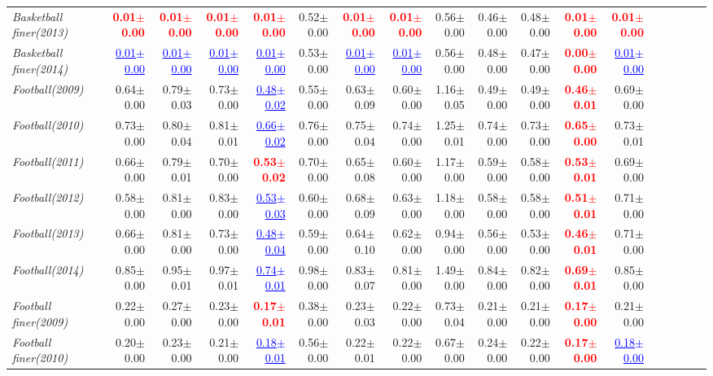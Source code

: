 \documentclass[nohyperref]{article}
\theoremstyle{plain}
\theoremstyle{definition}
\theoremstyle{remark}
\newcommand{\red}[1]{\textcolor{red}{\textbf{#1}}}
\newcommand{\blue}[1]{\textcolor{blue}{\underline{#1}}}
\begin{document}
\begin{table*}[!ht]
{\begin{tabular}{lrrrrrrrrrrrrrrrrr}
			{\it Basketball finer(2013)} & \red{0.01$\pm$0.00} & \red{0.01$\pm$0.00} & \red{0.01$\pm$0.00} & \red{0.01$\pm$0.00} & 0.52$\pm$0.00 & \red{0.01$\pm$0.00} & \red{0.01$\pm$0.00} & 0.56$\pm$0.00 & 0.46$\pm$0.00 & 0.48$\pm$0.00 & \red{0.01$\pm$0.00} & \red{0.01$\pm$0.00} \\
			{\it Basketball finer(2014)} & \blue{0.01$\pm$0.00} & \blue{0.01$\pm$0.00} & \blue{0.01$\pm$0.00} & \blue{0.01$\pm$0.00} & 0.53$\pm$0.00 & \blue{0.01$\pm$0.00} & \blue{0.01$\pm$0.00} & 0.56$\pm$0.00 & 0.48$\pm$0.00 & 0.47$\pm$0.00 & \red{0.00$\pm$0.00} & \blue{0.01$\pm$0.00} \\
			{\it Football(2009)} & 0.64$\pm$0.00 & 0.79$\pm$0.03 & 0.73$\pm$0.00 & \blue{0.48$\pm$0.02} & 0.55$\pm$0.00 & 0.63$\pm$0.09 & 0.60$\pm$0.00 & 1.16$\pm$0.05 & 0.49$\pm$0.00 & 0.49$\pm$0.00 & \red{0.46$\pm$0.01} & 0.69$\pm$0.00 \\
			{\it Football(2010)} & 0.73$\pm$0.00 & 0.80$\pm$0.04 & 0.81$\pm$0.01 & \blue{0.66$\pm$0.02} & 0.76$\pm$0.00 & 0.75$\pm$0.04 & 0.74$\pm$0.00 & 1.25$\pm$0.01 & 0.74$\pm$0.00 & 0.73$\pm$0.00 & \red{0.65$\pm$0.00} & 0.73$\pm$0.01 \\
			{\it Football(2011)} & 0.66$\pm$0.00 & 0.79$\pm$0.01 & 0.70$\pm$0.00 & \red{0.53$\pm$0.02} & 0.70$\pm$0.00 & 0.65$\pm$0.08 & 0.60$\pm$0.00 & 1.17$\pm$0.00 & 0.59$\pm$0.00 & 0.58$\pm$0.00 & \red{0.53$\pm$0.01} & 0.69$\pm$0.00 \\
			{\it Football(2012)} & 0.58$\pm$0.00 & 0.81$\pm$0.00 & 0.83$\pm$0.00 & \blue{0.53$\pm$0.03} & 0.60$\pm$0.00 & 0.68$\pm$0.09 & 0.63$\pm$0.00 & 1.18$\pm$0.00 & 0.58$\pm$0.00 & 0.58$\pm$0.00 & \red{0.51$\pm$0.01} & 0.71$\pm$0.00 \\
			{\it Football(2013)} & 0.66$\pm$0.00 & 0.81$\pm$0.00 & 0.73$\pm$0.00 & \blue{0.48$\pm$0.04} & 0.59$\pm$0.00 & 0.64$\pm$0.10 & 0.62$\pm$0.00 & 0.94$\pm$0.00 & 0.56$\pm$0.00 & 0.53$\pm$0.00 & \red{0.46$\pm$0.01} & 0.71$\pm$0.00 \\
			{\it Football(2014)} & 0.85$\pm$0.00 & 0.95$\pm$0.01 & 0.97$\pm$0.01 & \blue{0.74$\pm$0.01} & 0.98$\pm$0.00 & 0.83$\pm$0.07 & 0.81$\pm$0.00 & 1.49$\pm$0.00 & 0.84$\pm$0.00 & 0.82$\pm$0.00 & \red{0.69$\pm$0.01} & 0.85$\pm$0.00 \\
			{\it Football finer(2009)} & 0.22$\pm$0.00 & 0.27$\pm$0.00 & 0.23$\pm$0.00 & \red{0.17$\pm$0.01} & 0.38$\pm$0.00 & 0.23$\pm$0.03 & 0.22$\pm$0.00 & 0.73$\pm$0.04 & 0.21$\pm$0.00 & 0.21$\pm$0.00 & \red{0.17$\pm$0.00} & 0.21$\pm$0.00 \\
			{\it Football finer(2010)} & 0.20$\pm$0.00 & 0.23$\pm$0.00 & 0.21$\pm$0.00 & \blue{0.18$\pm$0.01} & 0.56$\pm$0.00 & 0.22$\pm$0.01 & 0.22$\pm$0.00 & 0.67$\pm$0.00 & 0.24$\pm$0.00 & 0.22$\pm$0.00 & \red{0.17$\pm$0.00} & \blue{0.18$\pm$0.00} \\

\end{tabular}}
\end{table*}
\end{document}
